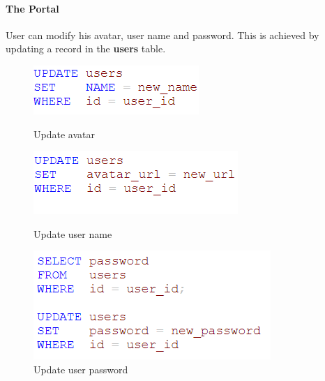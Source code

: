 \begin{CJK*}{UTF8}{gbsn}
\paragraph{The Portal}
User can modify his avatar, user name and password. This is achieved by updating a record in the \textbf{users} table.
\begin{figure}[htbp]
\centering
\begin{minipage}{0.32\textwidth}
\includegraphics[width=\linewidth]{avatar.png}
\caption{Update avatar}
\end{minipage}
\begin{minipage}{0.32\textwidth}
\includegraphics[width=\linewidth]{name.png}
\caption{Update user name}
\end{minipage}
\begin{minipage}{0.32\textwidth}
\includegraphics[width=\linewidth]{password.png}
\caption{Update user password}
\end{minipage}
\end{figure}


\end{CJK*}
